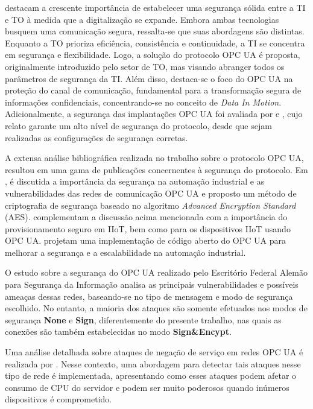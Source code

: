      destacam a crescente importância de estabelecer uma segurança sólida entre a TI e TO à medida que a digitalização se expande. Embora ambas tecnologias busquem uma comunicação segura, ressalta-se que suas abordagens são distintas. Enquanto a TO prioriza eficiência, consistência e continuidade, a TI se concentra em segurança e flexibilidade. Logo, a solução do protocolo OPC UA é proposta, originalmente introduzido pelo setor de TO, mas visando abranger todos os parâmetros de segurança da TI. Além disso, destaca-se o foco do OPC UA na proteção do canal de comunicação, fundamental para a transformação segura de informações confidenciais, concentrando-se no conceito de \textit{Data In Motion}. Adicionalmente, a segurança das implantações OPC UA foi avaliada por  e , cujo relato garante um alto nível de segurança do protocolo, desde que sejam realizadas as configurações de segurança corretas.

    A extensa análise bibliográfica realizada no trabalho sobre o protocolo OPC UA, resultou em uma gama de publicações concernentes à segurança do protocolo. Em \cite{luo2020}, é discutida a importância da segurança na automação industrial e as vulnerabilidades das redes de comunicação OPC UA e proposto um método de criptografia de segurança baseado no algoritmo \textit{Advanced Encryption Standard} (AES).  complementam a discussão acima mencionada com a importância do provisionamento seguro em IIoT, bem como \cite{kohnhauser2022} para os dispositivos IIoT usando OPC UA.  projetam uma implementação de código aberto do OPC UA para melhorar a segurança e a escalabilidade na automação industrial.

    O estudo sobre a segurança do OPC UA realizado pelo Escritório Federal Alemão para Segurança da Informação \cite{bsi2017} analisa as principais vulnerabilidades e possíveis ameaças dessas redes, baseando-se no tipo de mensagem e modo de segurança escolhido. No entanto, a maioria dos ataques são somente efetuados nos modos de segurança \textbf{None} e \textbf{Sign}, diferentemente do presente trabalho, nas quais as conexões são também estabelecidas no modo \textbf{Sign\&Encypt}.

    Uma análise detalhada sobre ataques de negação de serviço em redes OPC UA é realizada por . Nesse contexto, uma abordagem para detectar tais ataques nesse tipo de rede é implementada, apresentando como esses ataques podem afetar o consumo de CPU do servidor e podem ser muito poderosos quando inúmeros dispositivos é comprometido.


